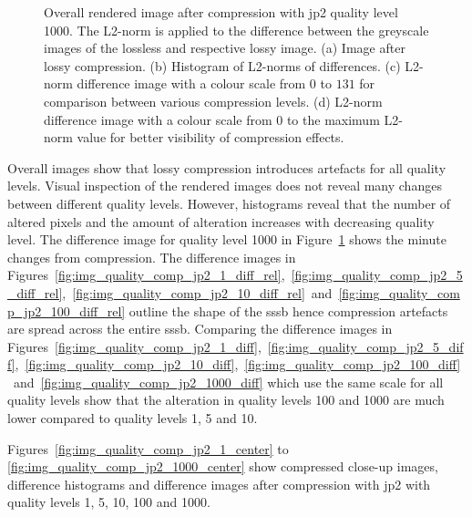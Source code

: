 \begin{figure}[htb]
\begin{subfigure}[b]{0.48\textwidth}
        \caption{}
        \label{fig:img_quality_comp_jp2_1000_diff_rel}
    \end{subfigure}
    \caption{Overall rendered image after compression with \gls{jp2} quality level 1000. The L2-norm is applied to the difference between the greyscale images of the lossless and respective lossy image. (a) Image after lossy compression. (b) Histogram of L2-norms of differences. (c) L2-norm difference image with a colour scale from $0$ to $131$ for comparison between various compression levels. (d) L2-norm difference image with a colour scale from $0$ to the maximum L2-norm value for better visibility of compression effects.}
    \label{fig:img_quality_comp_jp2_1000}
\end{figure}

Overall images show that lossy compression introduces artefacts for all quality levels. Visual inspection of the rendered images does not reveal many changes between different quality levels. However, histograms reveal that the number of altered pixels and the amount of alteration increases with decreasing quality level. The difference image for quality level 1000 in Figure~\ref{fig:img_quality_comp_jp2_1000_diff_rel} shows the minute changes from compression. The difference images in Figures~\ref{fig:img_quality_comp_jp2_1_diff_rel},~\ref{fig:img_quality_comp_jp2_5_diff_rel},~\ref{fig:img_quality_comp_jp2_10_diff_rel}~and~\ref{fig:img_quality_comp_jp2_100_diff_rel} outline the shape of the \gls{sssb} hence compression artefacts are spread across the entire \gls{sssb}. Comparing the difference images in Figures~\ref{fig:img_quality_comp_jp2_1_diff},~\ref{fig:img_quality_comp_jp2_5_diff},~\ref{fig:img_quality_comp_jp2_10_diff},~\ref{fig:img_quality_comp_jp2_100_diff}~and~\ref{fig:img_quality_comp_jp2_1000_diff} which use the same scale for all quality levels show that the alteration in quality levels \SI{100}{} and \SI{1000}{} are much lower compared to quality levels \SI{1}{}, \SI{5}{} and \SI{10}{}.

\clearpage

Figures~\ref{fig:img_quality_comp_jp2_1_center} to \ref{fig:img_quality_comp_jp2_1000_center} show compressed close-up images, difference histograms and difference images after compression with \gls{jp2} with quality levels \SI{1}{}, \SI{5}{}, \SI{10}{}, \SI{100}{} and \SI{1000}{}.

